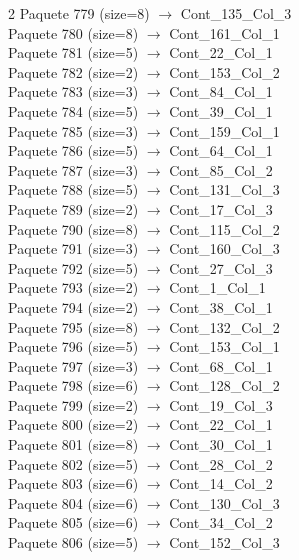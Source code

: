 \begin{multicols}{2}
Paquete 779 (size=8) $\rightarrow$ Cont\_135\_Col\_3\\
Paquete 780 (size=8) $\rightarrow$ Cont\_161\_Col\_1\\
Paquete 781 (size=5) $\rightarrow$ Cont\_22\_Col\_1\\
Paquete 782 (size=2) $\rightarrow$ Cont\_153\_Col\_2\\
Paquete 783 (size=3) $\rightarrow$ Cont\_84\_Col\_1\\
Paquete 784 (size=5) $\rightarrow$ Cont\_39\_Col\_1\\
Paquete 785 (size=3) $\rightarrow$ Cont\_159\_Col\_1\\
Paquete 786 (size=5) $\rightarrow$ Cont\_64\_Col\_1\\
Paquete 787 (size=3) $\rightarrow$ Cont\_85\_Col\_2\\
Paquete 788 (size=5) $\rightarrow$ Cont\_131\_Col\_3\\
Paquete 789 (size=2) $\rightarrow$ Cont\_17\_Col\_3\\
Paquete 790 (size=8) $\rightarrow$ Cont\_115\_Col\_2\\
Paquete 791 (size=3) $\rightarrow$ Cont\_160\_Col\_3\\
Paquete 792 (size=5) $\rightarrow$ Cont\_27\_Col\_3\\
Paquete 793 (size=2) $\rightarrow$ Cont\_1\_Col\_1\\
Paquete 794 (size=2) $\rightarrow$ Cont\_38\_Col\_1\\
Paquete 795 (size=8) $\rightarrow$ Cont\_132\_Col\_2\\
Paquete 796 (size=5) $\rightarrow$ Cont\_153\_Col\_1\\
Paquete 797 (size=3) $\rightarrow$ Cont\_68\_Col\_1\\
Paquete 798 (size=6) $\rightarrow$ Cont\_128\_Col\_2\\
Paquete 799 (size=2) $\rightarrow$ Cont\_19\_Col\_3\\
Paquete 800 (size=2) $\rightarrow$ Cont\_22\_Col\_1\\
Paquete 801 (size=8) $\rightarrow$ Cont\_30\_Col\_1\\
Paquete 802 (size=5) $\rightarrow$ Cont\_28\_Col\_2\\
Paquete 803 (size=6) $\rightarrow$ Cont\_14\_Col\_2\\
Paquete 804 (size=6) $\rightarrow$ Cont\_130\_Col\_3\\
Paquete 805 (size=6) $\rightarrow$ Cont\_34\_Col\_2\\
Paquete 806 (size=5) $\rightarrow$ Cont\_152\_Col\_3\\

\end{multicols}
